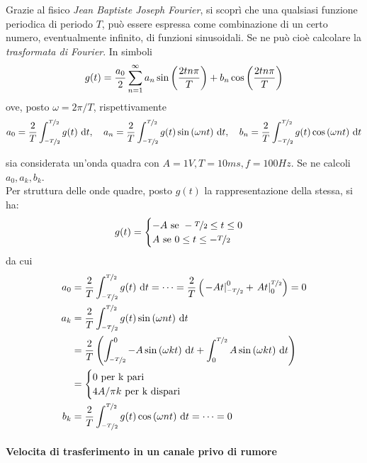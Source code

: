 \documentclass{subfiles}
\begin{document}
Grazie al fisico \emph{Jean Baptiste Joseph Fourier}, si scoprì che una qualsiasi funzione periodica di periodo \(T\),
può essere espressa come combinazione di un certo numero, eventualmente infinito, di funzioni sinusoidali.
Se ne può cioè calcolare la \emph{trasformata di Fourier}. In simboli
\begin{equation}
    g(t) = \Frac{a_{0}}{2} \Sum{a_{n} \Sin{\Frac{2 t n \pi}{T}} + b_{n} \Cos{\Frac{2 t n \pi}{T}}}{n = 1}[\infty]
\end{equation}
ove, posto \(\omega = 2\pi / T\), rispettivamente
\[
    a_{0} = \Frac{2}{T} \Int{g(t)}{t}[\Frac*{-T}{2}][\Frac*{T}{2}],                 \quad
    a_{n} = \Frac{2}{T} \Int{g(t) \Sin{\omega nt}}{t}[\Frac*{-T}{2}][\Frac*{T}{2}], \quad
    b_{n} = \Frac{2}{T} \Int{g(t) \Cos{\omega nt}}{t}[\Frac*{-T}{2}][\Frac*{T}{2}]
\]

\begin{Example*}
    sia considerata un'onda quadra con \(A = 1 V, T = 10 ms, f = 100 Hz\). Se ne calcoli \(a_{0}, a_{k}, b_{k}\). \\
    Per struttura delle onde quadre, posto \(g(t)\) la rappresentazione della stessa, si ha:
    \[
        g(t) = \begin{cases}
            -A \text{se} -\Frac*{T}{2} \le t \le 0 \\
            A \text{se} 0 \le t \le -\Frac*{T}{2}
        \end{cases}
    \]
    da cui
    \[\begin{aligned}
            a_{0} & = \Frac{2}{T} \Int{g(t)}{t}[\Frac*{-T}{2}][\Frac*{T}{2}]
            = \cdots = \Frac{2}{T} \left(\Eval{-At}{\Frac*{-T}{2}}[0] + \Eval{At}{0}[\Frac*{T}{2}]\right) = 0                                \\
            a_{k} & = \Frac{2}{T} \Int{g(t) \Sin{\omega nt}}{t}[\Frac*{-T}{2}][\Frac*{T}{2}]                                                 \\
                  & = \Frac{2}{T} \left(\Int{-A \Sin{\omega k t}}{t} [\Frac*{-T}{2}][0]+ \Int{A \Sin{\omega k t}}{t}[0][\Frac*{T}{2}]\right) \\
                  & = \begin{cases}
                          0 \text{per k pari} \\
                          4A/\pi k \text{per k dispari}
                      \end{cases}                                                                                           \\
            b_{k} & = \Frac{2}{T} \Int{g(t) \Cos{\omega nt}}{t}[\Frac*{-T}{2}][\Frac*{T}{2}]
            = \cdots = 0
        \end{aligned}\]
\end{Example*}
\clearpage

\paragraph{Velocita di trasferimento in un canale privo di rumore}

\end{document}
